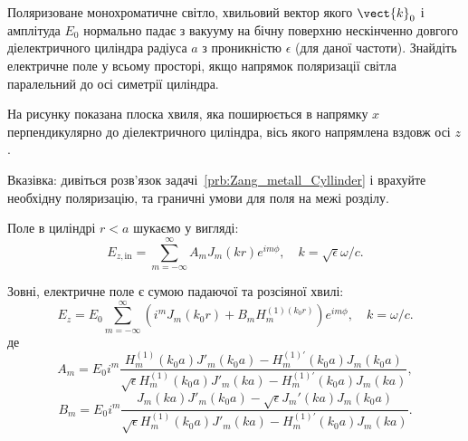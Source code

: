 \begin{problem}%
Поляризоване монохроматичне світло, хвильовий вектор якого $\vect{k}_0$  і амплітуда $E_0$ нормально
падає з вакууму на бічну поверхню нескінченно довгого діелектричного циліндра радіуса $a$ з
проникністю $\epsilon$ (для даної частоти). Знайдіть електричне поле у всьому просторі, якщо напрямок
поляризації світла паралельний до осі симетрії циліндра.
\begin{solution}
На рисунку показана плоска хвиля, яка поширюється в напрямку $x$ перпендикулярно до діелектричного циліндра, вісь якого напрямлена вздовж осі $z$.

	\begin{center}
	\end{center}

	Вказівка: дивіться розв'язок задачі~\ref{prb:Zang_metall_Cyllinder} і врахуйте необхідну поляризацію, та граничні умови для поля на межі розділу.

	Поле в циліндрі $r < a$ шукаємо у вигляді:
	\[
		E_{z,\text{in}} = \sum\limits_{m = -\infty}^{\infty}A_mJ_m(kr)e^{im\phi}, \quad k=\sqrt{\epsilon} \omega/c.
	\]

	Зовні, електричне поле є сумою падаючої та розсіяної хвилі:
	\[
		E_z = E_0 \sum\limits_{m = -\infty}^{\infty} \left( i^m J_m(k_0 r) + B_m H_m^{(1)(k_0r)} \right) e^{im\phi}, \quad k= \omega/c.
	\]
	де
	\[
		A_m = E_0i^m \frac{  H_m^{(1)}(k_0a) J'_m(k_0a) - H_m^{(1)\prime}(k_0a) J_m(k_0a)    }{ \sqrt{\epsilon} H_m^{(1)}(k_0a) J'_m(ka) - H_m^{(1)\prime}(k_0a) J_m(ka)},
	\]
	\[
		B_m = E_0i^m \frac{  J_m(ka) J'_m(k_0a) - \sqrt{\epsilon} J_m'(ka) J_m(k_0a)    }{ \sqrt{\epsilon} H_m^{(1)}(k_0a) J'_m(ka) - H_m^{(1)\prime}(k_0a) J_m(ka)}.
	\]

\end{solution}
\end{problem}

